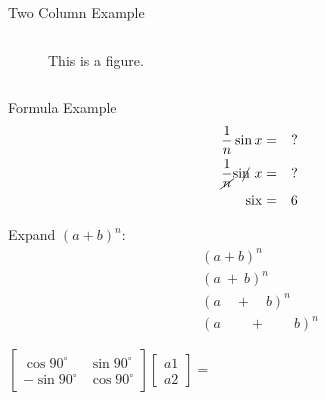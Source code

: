 \documentclass[10pt, xcolor={table}]{beamer}
\begin{document}
\begin{frame}{Two Column Example}
\begin{columns}[]
\begin{center}
\begin{figure}
        	\caption{This is a figure.}
        \end{figure}
        \end{center}
        \medskip    
    \end{columns}	
\end{frame}


\begin{frame}{Formula Example}
    \small
    \begin{eqnarray*}
        \frac{1}{n}\sin x & = & \mathrm{?} \\
        \frac{1}{\cancel{n}} \mathrm{si}\cancel{\mathrm{n}} ~x & = & \mathrm{?} \\
        \mathrm{six} & = & 6
    \end{eqnarray*}
    \bigskip
    
    \hspace{12mm} Expand $(a+b)^n$:  \vspace{-7mm}
    \begin{gather*}
      (a + b)^n\\
      (a\ + \ b)^n\\
      (a\quad + \quad b)^n\\
      (a\qquad + \qquad b)^n
    \end{gather*}
    \bigskip
    
    \begin{center}
    $
    \begin{bmatrix}
        \cos 90^{\circ} & \sin 90^{\circ}\\
       -\sin 90^{\circ} & \cos 90^{\circ}
    \end{bmatrix}
    \begin{bmatrix} a1 \\ a2 \end{bmatrix}
    =
    $
    \end{center}
    \bigskip
\end{frame}
\end{document}
